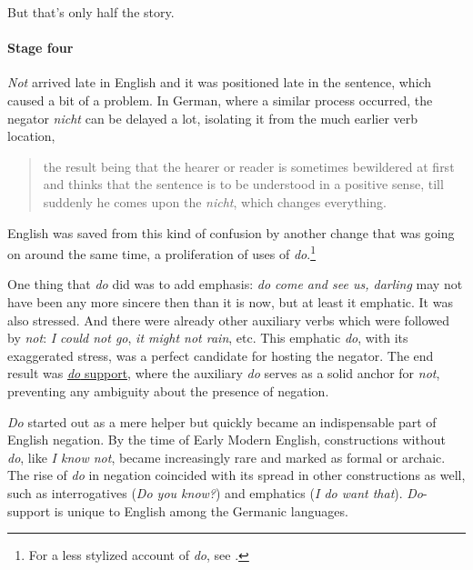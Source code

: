 But that's only half the story.

\paragraph*{Stage four}

\textit{Not} arrived late in English and it was positioned late in the sentence, which caused a bit of a problem. In German, where a similar process occurred, the negator \textit{nicht} can be delayed a lot, isolating it from the much earlier verb location,

\begin{quote}
    the result being that the hearer or reader is sometimes bewildered at first and thinks that the sentence is to be understood in a positive sense, till suddenly he comes upon the \textit{nicht}, which changes everything. \\ \citep[10]{Jespersen1917}
\end{quote}

English was saved from this kind of confusion by another change that was going on around the same time, a proliferation of uses of \textit{do}.\footnote{For a less stylized account of \textit{do}, see \citet{Denison1985}.}

One thing that \textit{do} did was to add emphasis: \textit{do come and see us, darling} may not have been any more sincere then than it is now, but at least it  emphatic. It was also stressed. And there were already other auxiliary verbs which were followed by \textit{not}: \textit{I could not go}, \textit{it might not rain}, etc. This emphatic \textit{do}, with its exaggerated stress, was a perfect candidate for hosting the negator. The end result was \hyperref[sec:sec:basic-do-support]{\textit{do} support}, where the auxiliary \textit{do} serves as a solid anchor for \textit{not}, preventing any ambiguity about the presence of negation.

\textit{Do} started out as a mere helper but quickly became an indispensable part of English negation. By the time of Early Modern English, constructions without \textit{do}, like \textit{I know not}, became increasingly rare and marked as formal or archaic. The rise of \textit{do} in negation coincided with its spread in other constructions as well, such as interrogatives (\textit{Do you know?}) and emphatics (\textit{I do want that}). \textit{Do}-support is unique to English among the Germanic languages.

